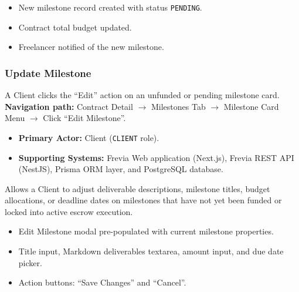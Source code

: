 \begin{itemize}[leftmargin=1.6em,topsep=3pt,itemsep=2pt,parsep=0pt,label=$\bullet$]
      \item New milestone record created with status \texttt{PENDING}.
      \item Contract total budget updated.
      \item Freelancer notified of the new milestone.
\end{itemize}

\subsubsection{ Update Milestone}

A Client clicks the ``Edit'' action on an unfunded or pending milestone card.\newline
\textbf{Navigation path:} Contract Detail $\rightarrow$ Milestones Tab $\rightarrow$ Milestone Card Menu $\rightarrow$ Click ``Edit Milestone''.


\begin{itemize}[leftmargin=1.6em,topsep=3pt,itemsep=2pt,parsep=0pt,label=$\bullet$]
      \item \textbf{Primary Actor:} Client (\texttt{CLIENT} role).
      \item \textbf{Supporting Systems:} Frevia Web application (Next.js), Frevia REST API (NestJS), Prisma ORM layer, and PostgreSQL database.
\end{itemize}

\noindent Allows a Client to adjust deliverable descriptions, milestone titles, budget allocations, or deadline dates on milestones that have not yet been funded or locked into active escrow execution.

\begin{itemize}[leftmargin=1.6em,topsep=3pt,itemsep=2pt,parsep=0pt,label=$\bullet$]
      \item Edit Milestone modal pre-populated with current milestone properties.
      \item Title input, Markdown deliverables textarea, amount input, and due date picker.
      \item Action buttons: ``Save Changes'' and ``Cancel''.
\end{itemize}

